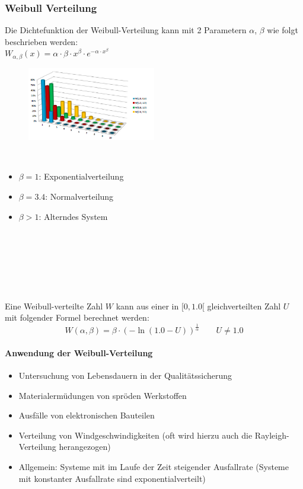 \subsubsection{Weibull Verteilung}
Die Dichtefunktion der Weibull-Verteilung kann mit 2 Parametern $\alpha$, $\beta$ wie folgt beschrieben werden:\\
$W_{\alpha,\beta}(x) = \alpha \cdot \beta \cdot x^\beta \cdot e^{-\alpha \cdot x^\beta}$ \\
\begin{figure}
    \vspace{-12pt}
    \centering
    \includegraphics[width=0.50\textwidth]{images/Simulation/Weibullverteilung.png}
\end{figure}
\ 
\vspace{-5pt}
\begin{itemize}
	\item $\beta = 1$:  Exponentialverteilung
	\item $\beta = 3.4$:  Normalverteilung
	\item $\beta > 1$:  Alterndes System
\end{itemize} 
\ \\ \ \\ \ \\ \ \\ \ \\ \ \\
Eine Weibull-verteilte Zahl $W$ kann aus einer in $[0, 1.0[$ gleichverteilten Zahl $U$ mit folgender Formel berechnet werden:
\begin{equation}
	W(\alpha,\beta) = \beta \cdot (-\ln(1.0-U))^\frac{1}{\alpha}  \qquad U \neq 1.0
\end{equation}
\paragraph{Anwendung der Weibull-Verteilung}
\begin{itemize}
	\item Untersuchung von Lebensdauern in der Qualitätssicherung
	\item Materialermüdungen von spröden Werkstoffen
	\item Ausfälle von elektronischen Bauteilen
	\item Verteilung von Windgeschwindigkeiten (oft wird hierzu auch die Rayleigh-Verteilung herangezogen)
	\item Allgemein: Systeme mit im Laufe der Zeit steigender Ausfallrate (Systeme mit konstanter Ausfallrate sind exponentialverteilt)
\end{itemize}

